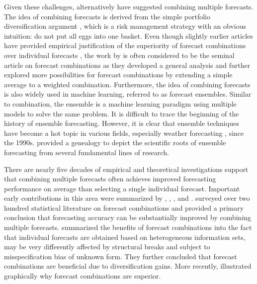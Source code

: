 \documentclass[11pt]{article}
\begin{document}
Given these challenges, alternatively \cite{Bates1969-yj} have suggested combining multiple forecasts. The idea of combining forecasts is derived from the simple portfolio diversification argument \citep{Timmermann2006-en}, which is a risk management strategy with an obvious intuition: do not put all eggs into one basket. Even though slightly earlier articles have provided empirical justification of the superiority of forecast combinations over individual forecasts \citep[e.g.,][]{Barnard1963-xa,crane1967two}, the work by \cite{Bates1969-yj} is often considered to be the seminal article on forecast combinations as they developed a general analysis and further explored more possibilities for forecast combinations by extending a simple average to a weighted combination. Furthermore, the idea of combining forecasts is also widely used in machine learning, referred to as forecast ensembles. Similar to combination, the ensemble is a machine learning paradigm using multiple models to solve the same problem. It is difficult to trace the beginning of the history of ensemble forecasting. However, it is clear that ensemble techniques have become a hot topic in various fields, especially weather forecasting \cite[see an overview by][]{Leutbecher2008-mc}, since the 1990s. \cite{Lewis2005-hu} provided a genealogy to depict the scientific roots of ensemble forecasting from several fundamental lines of research. 

There are nearly five decades of empirical and theoretical investigations support that combining multiple forecasts often achieves improved forecasting performance on average than selecting a single individual forecast. Important early contributions in this area were summarized by \cite{Granger1989-gv}, \cite{Clemen1989-fb}, \cite{Palm1992-im}, and \cite{Timmermann2006-en}. \cite{Clemen1989-fb} surveyed over two hundred statistical literature on forecast combinations and provided a primary conclusion that forecasting accuracy can be substantially improved by combining multiple forecasts. \cite{Timmermann2006-en} summarized the benefits of forecast combinations into the fact that individual forecasts are obtained based on heterogeneous information sets, may be very differently affected by structural breaks and subject to misspecification bias of unknown form. They further concluded that forecast combinations are beneficial due to diversification gains. More recently, \cite{Atiya2020-ge} illustrated graphically why forecast combinations are superior.
\end{document}
